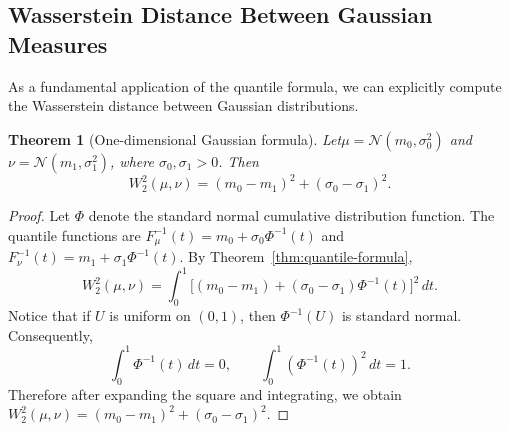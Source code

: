 \documentclass[11pt,a4paper]{article}
\newtheorem{theorem}{Theorem}[section]
\theoremstyle{definition}
\begin{document}
\subsection{Wasserstein Distance Between Gaussian Measures}
As a fundamental application of the quantile formula,
we can explicitly compute the Wasserstein distance between Gaussian distributions.
\begin{theorem}[One-dimensional Gaussian formula]
\label{thm:gaussian-w2}
Let$\mu=\mathcal{N} (m_0,\sigma_0^2)$ and $\nu=\mathcal{N}(m_1,\sigma_1^2)$,
where $\sigma_0,\sigma_1>0$. Then
\[
W_2^2(\mu,\nu) = (m_0-m_1)^2+(\sigma_0-\sigma_1)^2.
\]
\end{theorem}

\begin{proof}
Let $\Phi$ denote the standard normal cumulative distribution function.
The quantile functions are $F_\mu^{-1}(t)=m_0+\sigma_0\Phi^{-1}(t)$ and
$F_\nu^{-1}(t)=m_1+\sigma_1\Phi^{-1}(t).$ By Theorem~\ref{thm:quantile-formula},
\[
W_2^2(\mu,\nu)=
\int_0^1
\bigl[
(m_0-m_1)+(\sigma_0-\sigma_1)\Phi^{-1}(t)
\bigr]^2\,dt.
\]
Notice that if $U$ is uniform on $(0,1)$, then $\Phi^{-1}(U)$ is standard normal. Consequently,
\[
\int_0^1\Phi^{-1}(t)\,dt=0,
\qquad
\int_0^1(\Phi^{-1}(t))^2\,dt=1.
\]
Therefore after expanding the square and integrating, we obtain $W_2^2(\mu,\nu)=(m_0-m_1)^2+(\sigma_0-\sigma_1)^2$.
\end{proof}

\newpage\printbibliography
\end{document}
